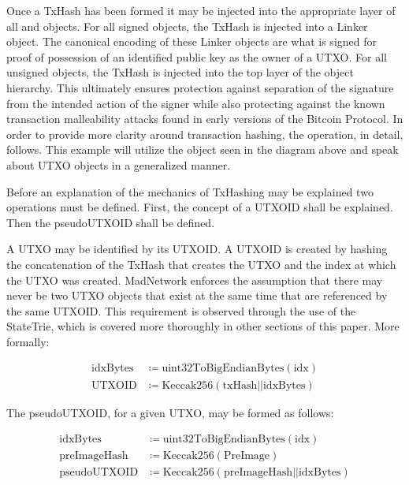 Once a TxHash has been formed it may be injected into the appropriate layer of
all \Vin{} and \Vout{} objects.
For all signed objects, the TxHash is injected into a Linker object.
The canonical encoding of these Linker objects are what is signed for proof
of possession of an identified public key as the owner of a UTXO.
For all unsigned objects, the TxHash is injected into the top layer of the
object hierarchy.
This ultimately ensures protection against separation of the signature from the
intended action of the signer while also protecting against the known
transaction malleability attacks found in early versions of the Bitcoin
Protocol.
In order to provide more clarity around transaction hashing, the operation, in
detail, follows.
This example will utilize the \TxIn{} object seen in the diagram above and speak
about UTXO objects in a generalized manner.

Before an explanation of the mechanics of TxHashing may be explained two
operations must be defined.
First, the concept of a UTXOID shall be explained.
Then the pseudoUTXOID shall be defined.

A UTXO may be identified by its UTXOID.
A UTXOID is created by hashing the concatenation of the TxHash that creates the
UTXO and the \Vout{} index at which the UTXO was created.
MadNetwork enforces the assumption that there may never be two UTXO objects
that exist at the same time that are referenced by the same UTXOID.
This requirement is observed through the use of the StateTrie, which is covered
more thoroughly in other sections of this paper.
More formally:

\begin{align*}
    \text{idxBytes} &\coloneqq \text{uint32ToBigEndianBytes}(\text{idx}) \\
    \text{UTXOID} &\coloneqq \text{Keccak256}(\text{txHash}||\text{idxBytes})
\end{align*}

\noindent
The pseudoUTXOID, for a given UTXO, may be formed as follows:

\begin{align*}
    \text{idxBytes} &\coloneqq \text{uint32ToBigEndianBytes}(\text{idx}) \\
    \text{preImageHash} &\coloneqq \text{Keccak256}(\text{PreImage}) \\
    \text{pseudoUTXOID} &\coloneqq \text{Keccak256}(\text{preImageHash} ||
        \text{idxBytes})
\end{align*}

